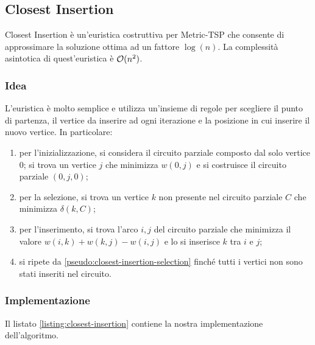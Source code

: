 \newpage

\subsection{Closest Insertion}
\label{sec:closest-insertion}

Closest Insertion è un'euristica costruttiva per Metric-TSP che 
consente di approssimare la soluzione ottima ad un fattore 
$\log(n)$. La complessità asintotica di quest'euristica è 
$\mathcal{O}(n^2)$.

\subsubsection{Idea}

L'euristica è molto semplice e utilizza un'insieme di regole per
scegliere il punto di partenza, il vertice da inserire ad ogni
iterazione e la posizione in cui inserire il nuovo vertice. In
particolare:

\begin{enumerate}
    \item per l'inizializzazione, si considera il circuito parziale composto
      dal solo vertice $0$; si trova un vertice $j$ che minimizza $w(0,
      j)$ e si costruisce il circuito parziale $(0, j,0)$;
    \item per la selezione, si trova un vertice $k$ non presente nel circuito
      parziale $C$ che minimizza $\delta(k,C)$;
    \label{pseudo:closest-insertion-selection}
    \item per l'inserimento, si trova l’arco ${i, j}$ del circuito parziale che
      minimizza il valore $w(i, k) + w(k, j) - w(i, j)$ e lo si inserisce
      $k$ tra $i$ e $j$;
    \item si ripete da \ref{pseudo:closest-insertion-selection} finché
tutti i vertici non sono stati inseriti nel circuito.
\end{enumerate}

\subsubsection{Implementazione}

\noindent Il listato \ref{listing:closest-insertion} contiene la
nostra implementazione dell'algoritmo.

